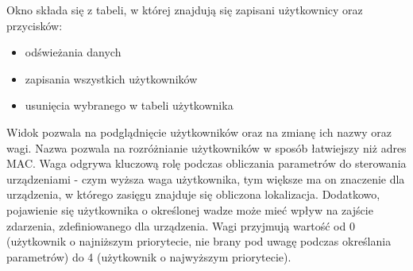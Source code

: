 Okno składa się z tabeli, w której znajdują się zapisani użytkownicy oraz przycisków:
\begin{itemize}
	\item odświeżania danych
	\item zapisania wszystkich użytkowników
	\item usunięcia wybranego w tabeli użytkownika
\end{itemize}
Widok pozwala na podglądnięcie użytkowników oraz na zmianę ich nazwy oraz wagi. Nazwa pozwala na rozróżnianie użytkowników w sposób łatwiejszy niż adres MAC. Waga odgrywa kluczową rolę podczas obliczania parametrów do sterowania urządzeniami - czym wyższa waga użytkownika, tym większe ma on znaczenie dla urządzenia, w którego zasięgu znajduje się obliczona lokalizacja. Dodatkowo, pojawienie się użytkownika o określonej wadze może mieć wpływ na zajście zdarzenia, zdefiniowanego dla urządzenia. Wagi przyjmują wartość od 0 (użytkownik o najniższym priorytecie, nie brany pod uwagę podczas określania parametrów) do 4 (użytkownik o najwyższym priorytecie).
